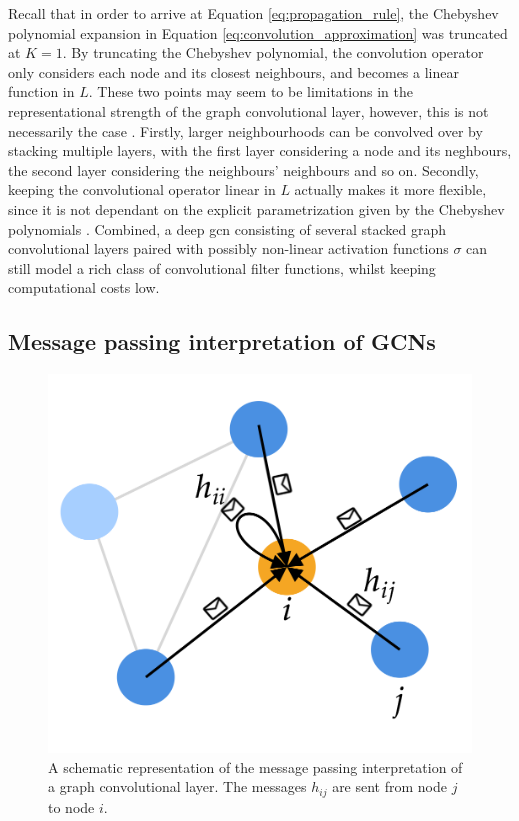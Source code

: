 Recall that in order to arrive at Equation \eqref{eq:propagation_rule}, the Chebyshev polynomial expansion in Equation \eqref{eq:convolution_approximation} was truncated at $K=1$. By truncating the Chebyshev polynomial, the convolution operator only considers each node and its closest neighbours, and becomes a linear function in $L$. These two points may seem to be limitations in the representational strength of the graph convolutional layer, however, this is not necessarily the case \cite{kipf_semi_supervised}. Firstly, larger neighbourhoods can be convolved over by stacking multiple layers, with the first layer considering a node and its neghbours, the second layer considering the neighbours' neighbours and so on. Secondly, keeping the convolutional operator linear in $L$ actually makes it more flexible, since it is not dependant on the explicit parametrization given by the Chebyshev polynomials \cite{kipf_semi_supervised}. Combined, a deep \acrshort{gcn} consisting of several stacked graph convolutional layers paired with possibly non-linear activation functions $\sigma$ can still model a rich class of convolutional filter functions, whilst keeping computational costs low. 


\subsection{Message passing interpretation of GCNs}
\label{subsec:message_passing}

\begin{figure}[!htbp]
    \centering
    \includegraphics[width=0.5\linewidth]{chapters/images_theory/message_passing_v2.png}
    \caption{A schematic representation of the message passing interpretation of a graph convolutional layer. The messages $h_{ij}$ are sent from node $j$ to node $i$.}
    \label{fig:message_passing}
\end{figure}

